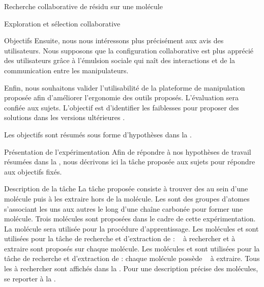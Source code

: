 \documentclass[myfrancais,ngerman,english,french]{mythesis}
\begin{document}
\begin{mychapter}{Recherche collaborative de résidu sur une molécule}
\begin{mysection}{Exploration et sélection collaborative}
\begin{mysubsection}{Objectifs}
				Ensuite, nous nous intéressons plus précisément aux avis des utilisateurs.
				Nous supposons que la configuration collaborative est plus apprécié des utilisateurs grâce à l'émulsion sociale qui naît des interactions et de la communication entre les manipulateurs.

				Enfin, nous souhaitons valider l'utilisabilité de la plateforme de manipulation proposée afin d'améliorer l'ergonomie des outils proposés.
				L'évaluation sera confiée aux sujets.
				L'objectif est d'identifier les faiblesses pour proposer des solutions dans les versions ultérieures \myShaddock.

				Les objectifs sont résumés sous forme d'hypothèses dans la .
			\end{mysubsection}
		\end{mysection}
		\begin{mysection}{Présentation de l'expérimentation}
			Afin de répondre à nos hypothèses de travail résumées dans la , nous décrivons ici la tâche proposée aux sujets pour répondre aux objectifs fixés.
			\begin{mysubsection}{Description de la tâche}
				La tâche proposée consiste à trouver des  au sein d'une molécule puis à les extraire hors de la molécule.
				Les  sont des groupes d'atomes s'associant les uns aux autres le long d'une chaîne carbonée pour former une molécule.
				Trois molécules sont proposées dans le cadre de cette expérimentation.
				La molécule \myTRPZIPPER sera utilisée pour la procédure d'apprentissage.
				Les molécules \myTRPCAGE et \myPrion sont utilisées pour la tâche de recherche et d'extraction de  : ~ à rechercher et à extraire sont proposés sur chaque molécule.
				Les molécules \myTRPCAGE et \myPrion sont utilisées pour la tâche de recherche et d'extraction de  : chaque molécule possède ~ à extraire.
				Tous les  à rechercher sont affichés dans la .
				Pour une description précise des molécules, se reporter à la .


\end{mysubsection}
\end{mysection}
\end{mychapter}
\end{document}
